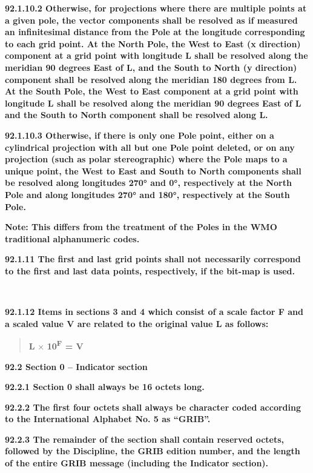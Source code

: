 \textbf{92.1.10.2 Otherwise, for projections where there are multiple points at a given pole, the vector components shall be resolved as if measured an infinitesimal distance from the Pole at the longitude corresponding to each grid point. At the North Pole, the West to East (x direction) component at a grid point with longitude L shall be resolved along the meridian 90 degrees East of L, and the South to North (y direction) component shall be resolved along the meridian 180 degrees from L. At the South Pole, the West to East component at a grid point with longitude L shall be resolved along the meridian 90 degrees East of L and the South to North component shall be resolved along L.}

\textbf{92.1.10.3 Otherwise, if there is only one Pole point, either on a cylindrical projection with all but one Pole point deleted, or on any projection (such as polar stereographic) where the Pole maps to a unique point, the West to East and South to North components shall be resolved along longitudes 270° and 0°, respectively at the North Pole and along longitudes 270° and 180°, respectively at the South Pole.}

\textbf{Note: This differs from the treatment of the Poles in the WMO traditional alphanumeric codes.}

\textbf{92.1.11 The first and last grid points shall not necessarily correspond to the first and last data points, respectively, if the bit-map is used.}

\textbf{\\
}

\textbf{92.1.12 Items in sections 3 and 4 which consist of a scale factor F and a scaled value V are related to the original value L as follows:}

\begin{quote}
\textbf{L} × \textbf{10\textsuperscript{F} = V}
\end{quote}

\textbf{92.2 Section 0 -- Indicator section}

\textbf{92.2.1 Section 0 shall always be 16 octets long.}

\textbf{92.2.2 The first four octets shall always be character coded according to the International Alphabet No. 5 as ``GRIB''.}

\textbf{92.2.3 The remainder of the section shall contain reserved octets, followed by the Discipline, the GRIB edition number, and the length of the entire GRIB message (including the Indicator section).}

